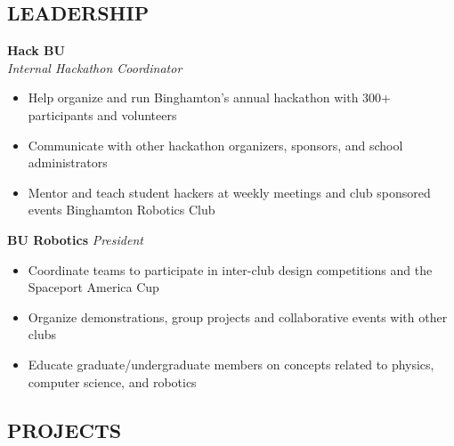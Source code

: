 \documentclass[11pt]{article}
\begin{document}
\subsection*{LEADERSHIP}
\vspace{1mm}
\spacedhrule{0.1em}{0.9em}
\textbf{Hack BU} \\
\textit{Internal Hackathon Coordinator}
\begin{itemize}
	\item Help organize and run Binghamton's annual hackathon with 300+ participants and volunteers
	\item Communicate with other hackathon organizers, sponsors, and school administrators
	\item Mentor and teach student hackers at weekly meetings and club sponsored events Binghamton Robotics Club
\end{itemize}
\textbf{BU Robotics}
\textit{President}
\begin{itemize}
	\item Coordinate teams to participate in inter-club design competitions and the Spaceport America Cup
	\item Organize demonstrations, group projects and collaborative events with other clubs
	\item Educate graduate/undergraduate members on concepts related to physics, computer science, and robotics
\end{itemize}
\vspace{2mm}

\subsection*{PROJECTS}
\vspace{1mm}
\spacedhrule{0.1em}{0.9em}
 
\end{document}
